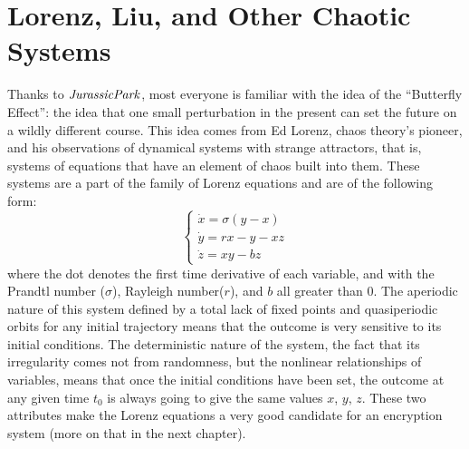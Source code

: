 \chapter{Lorenz, Liu, and Other Chaotic Systems}

\par Thanks to $\it{Jurassic Park}$, most everyone is familiar with the idea of the ``Butterfly Effect'':  the idea that one small perturbation in the present can set the future on a wildly different course.  This idea comes from Ed Lorenz, chaos theory's pioneer, and his observations of dynamical systems with strange attractors, that is, systems of equations that have an element of chaos built into them.  These systems are a part of the family of Lorenz equations and are of the following form:
%
\begin{equation}
\begin{cases} 
\dot{x} = \sigma(y-x) \\ 
\dot{y} = rx - y - xz \\ 
\dot{z} = xy - bz
\end{cases}
\end{equation}
%
where the dot denotes the first time derivative of each variable, and with the Prandtl number ($\sigma$), Rayleigh number($r$), and $b$ all greater than 0.  The aperiodic nature of this system defined by a total lack of fixed points and quasiperiodic orbits for any initial trajectory means that the outcome is very sensitive to its initial conditions.  The deterministic nature of the system, the fact that its irregularity comes not from randomness, but the nonlinear relationships of variables, means that once the initial conditions have been set, the outcome at any given time $t_0$ is always going to give the same values $x$, $y$, $z$.  These two attributes make the Lorenz equations a very good candidate for an encryption system (more on that in the next chapter).  


